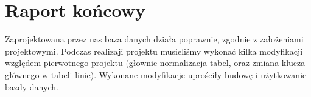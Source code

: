 \section{Raport końcowy}
Zaprojektowana przez nas baza danych działa poprawnie, zgodnie z założeniami projektowymi. Podczas realizaji projektu musieliśmy wykonać kilka modyfikacji względem 
pierwotnego projektu (głownie normalizacja tabel, oraz zmiana klucza głównego w tabeli linie). Wykonane modyfikacje uprościły budowę i użytkowanie bazdy danych.